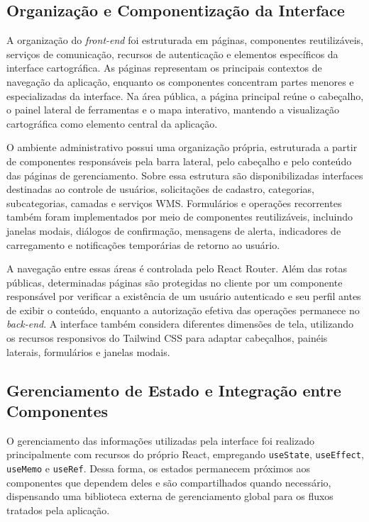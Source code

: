 \subsection{Organização e Componentização da Interface}
\label{sec:componentizacao-frontend}

A organização do \textit{front-end} foi estruturada em páginas, componentes reutilizáveis, serviços de comunicação, recursos de autenticação e elementos específicos da interface cartográfica. As páginas representam os principais contextos de navegação da aplicação, enquanto os componentes concentram partes menores e especializadas da interface. Na área pública, a página principal reúne o cabeçalho, o painel lateral de ferramentas e o mapa interativo, mantendo a visualização cartográfica como elemento central da aplicação.

O ambiente administrativo possui uma organização própria, estruturada a partir de componentes responsáveis pela barra lateral, pelo cabeçalho e pelo conteúdo das páginas de gerenciamento. Sobre essa estrutura são disponibilizadas interfaces destinadas ao controle de usuários, solicitações de cadastro, categorias, subcategorias, camadas e serviços WMS. Formulários e operações recorrentes também foram implementados por meio de componentes reutilizáveis, incluindo janelas modais, diálogos de confirmação, mensagens de alerta, indicadores de carregamento e notificações temporárias de retorno ao usuário.

A navegação entre essas áreas é controlada pelo React Router. Além das rotas públicas, determinadas páginas são protegidas no cliente por um componente responsável por verificar a existência de um usuário autenticado e seu perfil antes de exibir o conteúdo, enquanto a autorização efetiva das operações permanece no \textit{back-end}. A interface também considera diferentes dimensões de tela, utilizando os recursos responsivos do Tailwind CSS para adaptar cabeçalhos, painéis laterais, formulários e janelas modais.

\subsection{Gerenciamento de Estado e Integração entre Componentes}
\label{sec:estado-integracao-frontend}

O gerenciamento das informações utilizadas pela interface foi realizado principalmente com recursos do próprio React, empregando \texttt{useState}, \texttt{useEffect}, \texttt{useMemo} e \texttt{useRef}. Dessa forma, os estados permanecem próximos aos componentes que dependem deles e são compartilhados quando necessário, dispensando uma biblioteca externa de gerenciamento global para os fluxos tratados pela aplicação.

